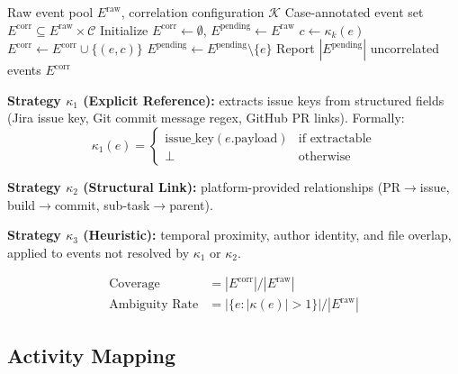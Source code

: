 \begin{algorithm}[htbp]
\caption{Case Correlation Cascade}
\label{alg:correlation}
\begin{algorithmic}[1]
\REQUIRE Raw event pool $E^{\text{raw}}$, correlation configuration $\mathcal{K}$
\ENSURE Case-annotated event set $E^{\text{corr}} \subseteq E^{\text{raw}} \times \mathcal{C}$
\STATE Initialize $E^{\text{corr}} \gets \emptyset$, $E^{\text{pending}} \gets E^{\text{raw}}$
        \STATE $c \gets \kappa_k(e)$
            \STATE $E^{\text{corr}} \gets E^{\text{corr}} \cup \{(e, c)\}$
            \STATE $E^{\text{pending}} \gets E^{\text{pending}} \setminus \{e\}$
        \ENDIF
    \ENDFOR
\ENDFOR
\STATE Report $|E^{\text{pending}}|$ uncorrelated events
\RETURN $E^{\text{corr}}$
\end{algorithmic}
\end{algorithm}

\textbf{Strategy $\kappa_1$ (Explicit Reference):} extracts issue keys from
structured fields (Jira issue key, Git commit message regex, GitHub PR
links). Formally:
\begin{equation}
\label{eq:kappa1}
\kappa_1(e) = \begin{cases}
    \text{issue\_key}(e.\text{payload}) & \text{if extractable} \\
    \bot & \text{otherwise}
\end{cases}
\end{equation}

\textbf{Strategy $\kappa_2$ (Structural Link):} platform-provided
relationships (PR$\to$issue, build$\to$commit, sub-task$\to$parent).

\textbf{Strategy $\kappa_3$ (Heuristic):} temporal proximity, author
identity, and file overlap, applied to events not resolved by $\kappa_1$
or $\kappa_2$.

\begin{definition}
\label{def:corr-quality}
\begin{align}
\text{Coverage}      &= |E^{\text{corr}}| / |E^{\text{raw}}|
    \label{eq:corr-coverage} \\
\text{Ambiguity Rate} &= |\{e : |\kappa(e)| > 1\}| / |E^{\text{raw}}|
    \label{eq:corr-ambiguity}
\end{align}
\end{definition}


\subsection{Activity Mapping}
\label{sec:s1-mapping}

